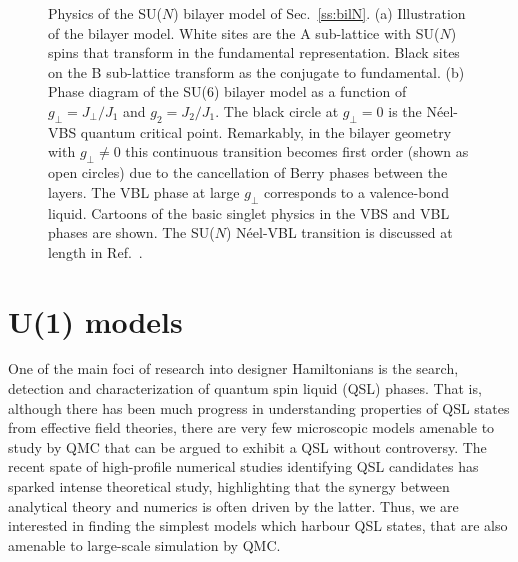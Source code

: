 \documentclass[range]{ar2e}
\begin{document}
\begin{figure}
\centerline{}
  \caption{ \label{fig:pd_bil}  Physics of the SU($N$) bilayer model  of Sec.~\ref{ss:bilN}.  (a) Illustration of the bilayer model. White sites are the A sub-lattice with SU($N$) spins that transform in the fundamental representation. Black sites on the B sub-lattice transform as the conjugate to fundamental. (b) Phase diagram of the
    SU($6$) bilayer model as a function of $g_\perp =J_\perp/J_1$ and $g_2=J_2/J_1$. The black circle at $g_\perp=0$ is the N\'eel-VBS quantum critical point. Remarkably, in the bilayer geometry with $g_\perp\neq 0$ this continuous transition becomes first order (shown as open circles) due to the cancellation of Berry phases between the layers. The VBL phase at large $g_\perp$ corresponds to a valence-bond liquid. Cartoons of the basic singlet physics in the VBS and VBL phases are shown. The SU($N$) N\'eel-VBL transition is discussed at length in Ref.~\cite{kaul2012:sun_bil}.}
\end{figure}

\section{U(1) models}
\label{sec:u1models}

One of the main foci of research into designer Hamiltonians is the search, detection and characterization of quantum spin liquid (QSL) phases.  
That is, although there has been much progress in understanding properties of QSL states from effective field theories, there are very few microscopic models amenable to study by QMC that can be argued to exhibit a QSL without controversy.
The recent spate of high-profile numerical studies identifying QSL candidates \cite{Yan, Meng,J1J2} has sparked intense theoretical study, highlighting that the synergy between analytical theory and numerics is often driven by the latter.  Thus, we are interested in finding the simplest models which harbour QSL states, that are also amenable to large-scale simulation by QMC.
\end{document}

